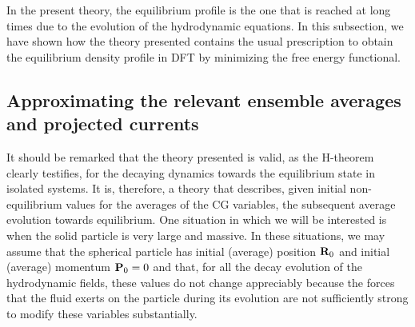 \documentclass[b5paper,openright,11pt]{book}
\begin{document}
In the  present theory,  the equilibrium  profile is  the one  that is
reached  at  long times  due  to  the  evolution of  the  hydrodynamic
equations.  In this subsection, we have shown how the theory presented
contains  the usual  prescription  to obtain  the equilibrium  density
profile in  DFT by minimizing the  free energy
functional.

\subsection{Approximating the relevant ensemble averages and projected
  currents}
It  should be  remarked that  the theory  presented is  valid, as  the
H-theorem  clearly testifies,  for the  decaying dynamics  towards the
equilibrium state in isolated systems. It is, therefore, a theory that
describes, given initial non-equilibrium values for  the averages of the CG variables,
the subsequent  average evolution towards equilibrium.   One situation
in which  we will  be interested  is when the  solid particle  is very
large and  massive.  In these situations, we may assume
that the spherical particle has initial (average) position ${\bf R}_0$
and initial  (average) momentum  ${\bf P}_0=0$ and  that, for  all the
decay evolution of the hydrodynamic fields, these values do not change
appreciably because the  forces that the fluid exerts  on the particle
during  its evolution  are  not sufficiently  strong  to modify  these
variables substantially.
\end{document}
